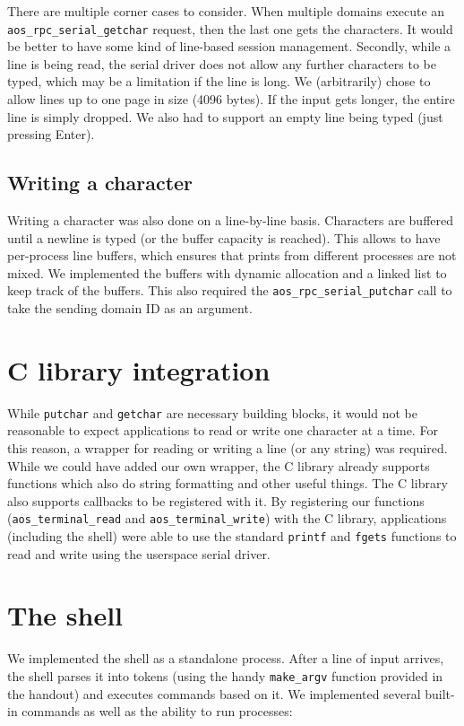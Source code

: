 There are multiple corner cases to consider.
When multiple domains execute an \verb|aos_rpc_serial_getchar| request, then the last one gets the characters.
It would be better to have some kind of line-based session management.
Secondly, while a line is being read, the serial driver does not allow any further characters to be typed, which may be a limitation if the line is long.
We (arbitrarily) chose to allow lines up to one page in size (4096 bytes).
If the input gets longer, the entire line is simply dropped.
We also had to support an empty line being typed (just pressing Enter).

\subsection{Writing a character}

Writing a character was also done on a line-by-line basis.
Characters are buffered until a newline is typed (or the buffer capacity is reached).
This allows to have per-process line buffers, which ensures that prints from different processes are not mixed.
We implemented the buffers with dynamic allocation and a linked list to keep track of the buffers.
This also required the \verb|aos_rpc_serial_putchar| call to take the sending domain ID as an argument.


\section{C library integration}

While \verb|putchar| and \verb|getchar| are necessary building blocks, it would not be reasonable to expect applications to read or write one character at a time.
For this reason, a wrapper for reading or writing a line (or any string) was required.
While we could have added our own wrapper, the C library already supports functions which also do string formatting and other useful things.
The C library also supports callbacks to be registered with it.
By registering our functions (\verb|aos_terminal_read| and \verb|aos_terminal_write|) with the C library, applications (including the shell) were able to use the standard \verb|printf| and \verb|fgets| functions to read and write using the userspace serial driver.


\section{The shell}

We implemented the shell as a standalone process.
After a line of input arrives, the shell parses it into tokens (using the handy \verb|make_argv| function provided in the handout) and executes commands based on it.
We implemented several built-in commands as well as the ability to run processes:

